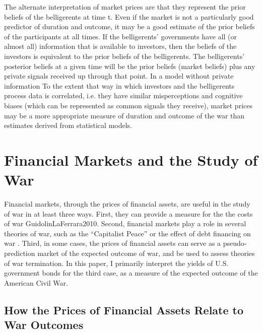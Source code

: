 The alternate interpretation of market prices are that they represent the prior beliefs of the belligerents at time t.
Even if the market is not a particularly good predictor of duration and outcome, it may be a good estimate of the prior beliefs of the participants at all times.
If the belligerents' governments have all (or almost all) information that is available to investors, then the beliefs of the investors is equivalent to the prior beliefs of the belligerents. The belligerents' posterior beliefs at a given time will be the prior beliefs (market beliefs) plus any private signals received up through that point.
In a model without private information
To the extent that way in which investors and the belligerents process data is correlated, i.e. they have similar misperceptions and cognitive biases (which can be represented as common signals they receive), market prices may be a more appropriate measure of duration and outcome of the war than estimates derived from statistical models.




\section{Financial Markets and the Study of War}
\label{bonds_battles:sec:barg-theory-war}

Financial markets, through the prices of financial assets, are useful in the study of war in at least three ways.
First, they can provide a measure for the the costs of war \parencite{SchneiderTroeger2006}{GuidolinLaFerrara2010}.
Second, financial markets play a role in several theories of war, such as the ``Capitalist Peace'' \parencites{Gartzke2007}{DafoeKelsey2014a} or the effect of debt financing on war \parencite{Slantchev2012a}.
Third, in some cases, the prices of financial assets can serve as a pseudo-prediction market of the expected outcome of war, and be used to assess theories of war termination.
In this paper, I primarily interpret the yields of U.S. government bonds for the third case, as a measure of the expected outcome of the American Civil War.



\subsection{How the Prices of Financial Assets Relate to War Outcomes}
\label{bonds_battles:sec:how-prices-financial}

